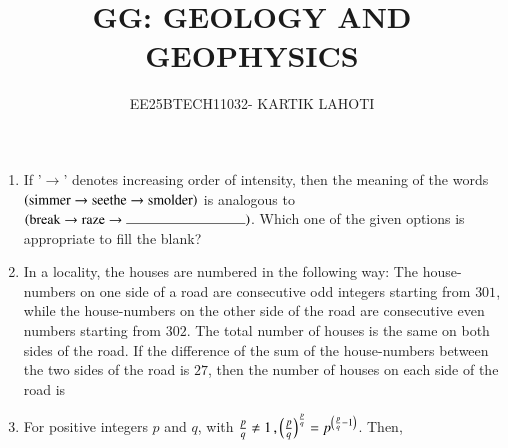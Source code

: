 \documentclass[journal,12pt,onecolumn]{IEEEtran}
\title{GG: GEOLOGY AND GEOPHYSICS}
\author{EE25BTECH11032- KARTIK LAHOTI}
\theoremstyle{remark}
\begin{document}
\maketitle

\begin{enumerate}

\item If '$\rightarrow$' denotes increasing order of intensity, then the meaning of the words $\left(\text{simmer} \rightarrow \text{seethe} \rightarrow \text{smolder}\right)$ is analogous to $\brak{\text{break} \rightarrow \text{raze} \rightarrow \rule{3cm}{0.15mm}}$. Which one of the given options is appropriate to fill the blank?
\begin{enumerate}
\end{enumerate}
\hfill{}

\item In a locality, the houses are numbered in the following way:
The house-numbers on one side of a road are consecutive odd integers starting from $301$, while the house-numbers on the other side of the road are consecutive even numbers starting from $302$. The total number of houses is the same on both sides of the road.
If the difference of the sum of the house-numbers between the two sides of the road is $27$, then the number of houses on each side of the road is
\begin{enumerate}
\end{enumerate}
\hfill{}

\item For positive integers $p$ and $q$, with $\frac{p}{q} \neq 1\,, \left(\frac{p}{q}\right)^{\frac{p}{q}} = p^{\left(\frac{p}{q}-1\right)}$. Then,
\begin{enumerate}
\end{enumerate}
\hfill{}


\end{enumerate}
\end{document}
